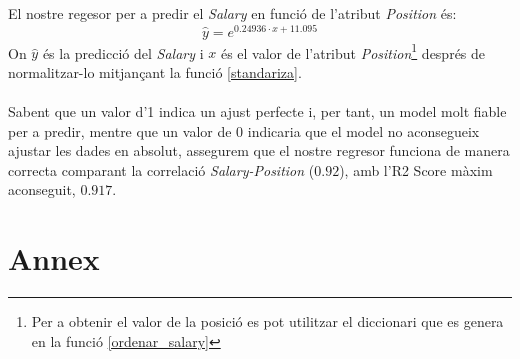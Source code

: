 \documentclass[a4paper, 11pt]{article}
\begin{document}
El nostre regesor per a predir el \textit{Salary} en funció de l'atribut \textit{Position} és:
$$\hat{y} = e^{0.24936\cdot x +11.095}$$
On $\hat{y}$ és la predicció del \textit{Salary} i $x$ és el valor de l'atribut \textit{Position}\footnote{Per a obtenir el valor de la posició es pot utilitzar el diccionari que es genera en la funció \textcolor{blue}{\ref{ordenar_salary}}} després de normalitzar-lo mitjançant la funció \textcolor{blue}{\ref{standariza}}. \\\\
Sabent que un valor d'1 indica un ajust perfecte i, per tant, un model molt fiable per a predir, mentre que un valor de 0 indicaria que el model no aconsegueix ajustar les dades en absolut, assegurem que el nostre regresor funciona de manera correcta comparant la correlació \textit{Salary-Position} ($0.92$), amb l'R2 Score màxim aconseguit, $0.917$.




\newpage
\section{Annex}\label{annex}
\end{document}
